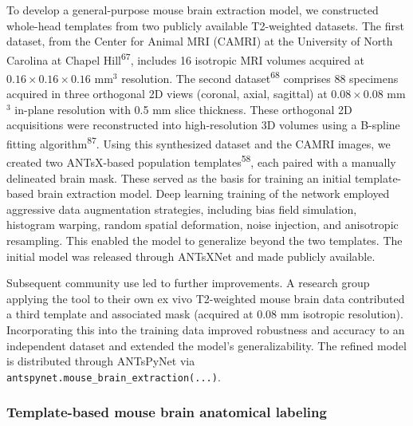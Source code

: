 \documentclass[
  12pt,
]{article}
\begin{document}
To develop a general-purpose mouse brain extraction model, we
constructed whole-head templates from two publicly available T2-weighted
datasets. The first dataset, from the Center for Animal MRI (CAMRI) at
the University of North Carolina at Chapel Hill\textsuperscript{67},
includes 16 isotropic MRI volumes acquired at
\(0.16 \times 0.16 \times 0.16\) mm\(^3\) resolution. The second
dataset\textsuperscript{68} comprises 88 specimens acquired in three
orthogonal 2D views (coronal, axial, sagittal) at \(0.08 \times 0.08\)
mm\(^3\) in-plane resolution with 0.5 mm slice thickness. These
orthogonal 2D acquisitions were reconstructed into high-resolution 3D
volumes using a B-spline fitting algorithm\textsuperscript{87}. Using
this synthesized dataset and the CAMRI images, we created two
ANTsX-based population templates\textsuperscript{58}, each paired with a
manually delineated brain mask. These served as the basis for training
an initial template-based brain extraction model. Deep learning training
of the network employed aggressive data augmentation strategies,
including bias field simulation, histogram warping, random spatial
deformation, noise injection, and anisotropic resampling. This enabled
the model to generalize beyond the two templates. The initial model was
released through ANTsXNet and made publicly available.

Subsequent community use led to further improvements. A research group
applying the tool to their own ex vivo T2-weighted mouse brain data
contributed a third template and associated mask (acquired at 0.08 mm
isotropic resolution). Incorporating this into the training data
improved robustness and accuracy to an independent dataset and extended
the model's generalizability. The refined model is distributed through
ANTsPyNet via \texttt{antspynet.mouse\_brain\_extraction(...)}.

\subsubsection{Template-based mouse brain anatomical
labeling}\label{template-based-mouse-brain-anatomical-labeling}
\end{document}
